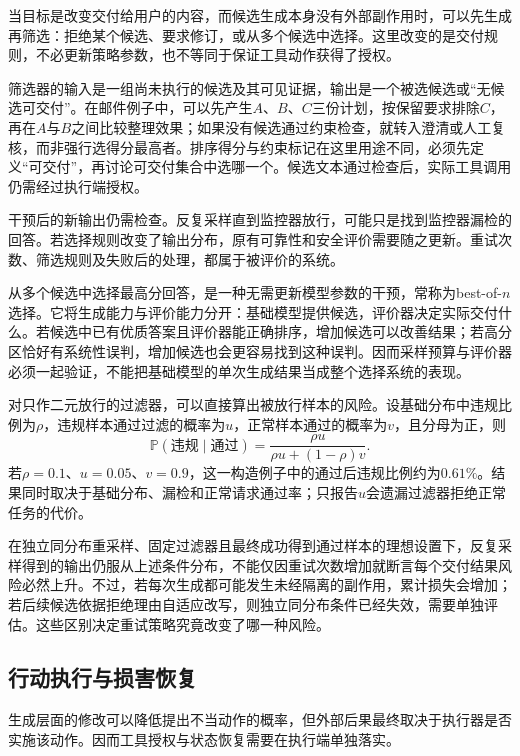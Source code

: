 当目标是改变交付给用户的内容，而候选生成本身没有外部副作用时，可以先生成再筛选：拒绝某个候选、要求修订，或从多个候选中选择。这里改变的是交付规则，不必更新策略参数，也不等同于保证工具动作获得了授权。

筛选器的输入是一组尚未执行的候选及其可见证据，输出是一个被选候选或“无候选可交付”。在邮件例子中，可以先产生$A$、$B$、$C$三份计划，按保留要求排除$C$，再在$A$与$B$之间比较整理效果；如果没有候选通过约束检查，就转入澄清或人工复核，而非强行选得分最高者。排序得分与约束标记在这里用途不同，必须先定义“可交付”，再讨论可交付集合中选哪一个。候选文本通过检查后，实际工具调用仍需经过执行端授权。

干预后的新输出仍需检查。反复采样直到监控器放行，可能只是找到监控器漏检的回答。若选择规则改变了输出分布，原有可靠性和安全评价需要随之更新。重试次数、筛选规则及失败后的处理，都属于被评价的系统。

从多个候选中选择最高分回答，是一种无需更新模型参数的干预，常称为best-of-$n$选择。它将生成能力与评价能力分开：基础模型提供候选，评价器决定实际交付什么。若候选中已有优质答案且评价器能正确排序，增加候选可以改善结果；若高分区恰好有系统性误判，增加候选也会更容易找到这种误判。因而采样预算与评价器必须一起验证，不能把基础模型的单次生成结果当成整个选择系统的表现。

对只作二元放行的过滤器，可以直接算出被放行样本的风险。设基础分布中违规比例为$\rho$，违规样本通过过滤的概率为$u$，正常样本通过的概率为$v$，且分母为正，则
\begin{equation}
 \mathbb P(\text{违规}\mid\text{通过})
 =\frac{\rho u}{\rho u+(1-\rho)v}.
 \label{eq:alignment-filter-risk}
\end{equation}
若$\rho=0.1$、$u=0.05$、$v=0.9$，这一构造例子中的通过后违规比例约为$0.61\%$。结果同时取决于基础分布、漏检和正常请求通过率；只报告$u$会遗漏过滤器拒绝正常任务的代价。

在独立同分布重采样、固定过滤器且最终成功得到通过样本的理想设置下，反复采样得到的输出仍服从上述条件分布，不能仅因重试次数增加就断言每个交付结果风险必然上升。不过，若每次生成都可能发生未经隔离的副作用，累计损失会增加；若后续候选依据拒绝理由自适应改写，则独立同分布条件已经失效，需要单独评估。这些区别决定重试策略究竟改变了哪一种风险。

\subsection{行动执行与损害恢复}
\label{sec:alignment-intervention-execution}

生成层面的修改可以降低提出不当动作的概率，但外部后果最终取决于执行器是否实施该动作。因而工具授权与状态恢复需要在执行端单独落实。

